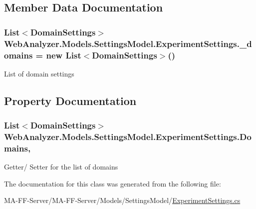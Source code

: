 \subsection{Member Data Documentation}
\hypertarget{class_web_analyzer_1_1_models_1_1_settings_model_1_1_experiment_settings_af281048ad1d067569180dcae2d763522}{}
\subsubsection[{\+\_\+domains}]{\setlength{\rightskip}{0pt plus 5cm}List$<${\bf Domain\+Settings}$>$ Web\+Analyzer.\+Models.\+Settings\+Model.\+Experiment\+Settings.\+\_\+domains = new List$<${\bf Domain\+Settings}$>$()\hspace{0.3cm}{\ttfamily [private]}}\label{class_web_analyzer_1_1_models_1_1_settings_model_1_1_experiment_settings_af281048ad1d067569180dcae2d763522}


List of domain settings 



\subsection{Property Documentation}
\hypertarget{class_web_analyzer_1_1_models_1_1_settings_model_1_1_experiment_settings_a3eb9dd2816871834368fe4dfd5a1b52e}{}
\subsubsection[{Domains}]{\setlength{\rightskip}{0pt plus 5cm}List$<${\bf Domain\+Settings}$>$ Web\+Analyzer.\+Models.\+Settings\+Model.\+Experiment\+Settings.\+Domains\hspace{0.3cm}{\ttfamily [get]}, {\ttfamily [set]}}\label{class_web_analyzer_1_1_models_1_1_settings_model_1_1_experiment_settings_a3eb9dd2816871834368fe4dfd5a1b52e}


Getter/ Setter for the list of domains 



The documentation for this class was generated from the following file\+:\begin{DoxyCompactItemize}
\item 
M\+A-\/\+F\+F-\/\+Server/\+M\+A-\/\+F\+F-\/\+Server/\+Models/\+Settings\+Model/\hyperlink{_experiment_settings_8cs}{Experiment\+Settings.\+cs}\end{DoxyCompactItemize}
